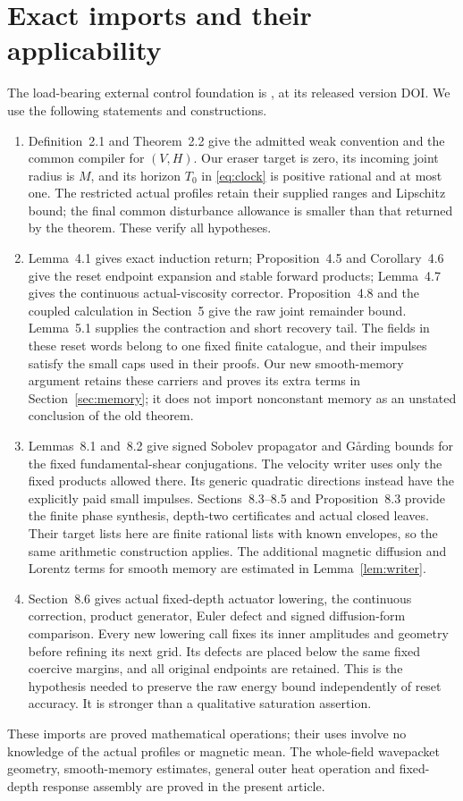 \documentclass[11pt,a4paper]{amsart}
\theoremstyle{definition}
\theoremstyle{remark}
\numberwithin{equation}{section}
\begin{document}
\section{Exact imports and their applicability}\label{app:imports}
The load-bearing external control foundation is \cite{Common}, at its
released version DOI. We use the following statements and constructions.
\begin{enumerate}
\item Definition~2.1 and Theorem~2.2 give the admitted weak convention and
the common compiler for $(V,H)$. Our eraser target is zero, its incoming
joint radius is $M$, and its horizon $T_0$ in \eqref{eq:clock} is positive
rational and at most one. The restricted actual profiles retain their
supplied ranges and Lipschitz bound; the final common disturbance allowance
is smaller than that returned by the theorem. These verify all hypotheses.
\item Lemma~4.1 gives exact induction return; Proposition~4.5 and
Corollary~4.6 give the reset endpoint expansion and stable forward products;
Lemma~4.7 gives the continuous actual-viscosity corrector. Proposition~4.8
and the coupled calculation in Section~5 give the raw joint remainder
bound. Lemma~5.1 supplies the contraction and short recovery tail.
The fields in these reset words belong to one fixed finite catalogue,
and their impulses satisfy the small caps used in their proofs. Our new
smooth-memory argument retains these carriers and proves its extra terms
in Section~\ref{sec:memory}; it does not import nonconstant memory as an
unstated conclusion of the old theorem.
\item Lemmas~8.1 and~8.2 give signed Sobolev propagator and G\aa rding bounds
for the fixed fundamental-shear conjugations. The velocity writer uses
only the fixed products allowed there. Its generic quadratic directions
instead have the explicitly paid small impulses. Sections~8.3--8.5 and
Proposition~8.3 provide the finite phase synthesis, depth-two certificates
and actual closed leaves. Their target lists here are finite rational
lists with known envelopes, so the same arithmetic construction applies.
The additional magnetic diffusion and Lorentz terms for smooth memory
are estimated in Lemma~\ref{lem:writer}.
\item Section~8.6 gives actual fixed-depth actuator lowering, the continuous
correction, product generator, Euler defect and signed diffusion-form
comparison. Every new lowering call fixes its inner amplitudes and
geometry before refining its next grid. Its defects are placed below
the same fixed coercive margins, and all original endpoints are retained.
This is the hypothesis needed to preserve the raw energy bound independently
of reset accuracy. It is stronger than a qualitative saturation assertion.
\end{enumerate}
These imports are proved mathematical operations; their uses involve no
knowledge of the actual profiles or magnetic mean. The whole-field
wavepacket geometry, smooth-memory estimates, general outer heat operation
and fixed-depth response assembly are proved in the present article.
\end{document}
